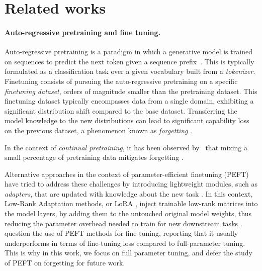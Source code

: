 \section{Related works}
\paragraph{Auto-regressive pretraining and fine tuning.} Auto-regressive pretraining is a paradigm in which a generative model is trained on sequences to predict the next token given a sequence prefix~\citep{sutskever2014sequence}. This is typically formulated as a classification task over a given vocabulary built from a \textit{tokenizer}. 
Finetuning consists of pursuing the auto-regressive pretraining on a specific \textit{finetuning dataset}, orders of magnitude smaller than the pretraining dataset. 
This finetuning dataset typically encompasses data from a single domain, exhibiting a significant distribution shift compared to the base dataset. 
Transferring the model knowledge to the new distributions can lead to significant capability loss on the previous dataset, a phenomenon known as \textit{forgetting} \cite{luo2023empirical,kalajdzievski2024scaling}.

In the context of \textit{continual pretraining}, it has been observed by~\citet{ibrahim2024simple} that mixing a small percentage of pretraining data mitigates forgetting \citep[see][for an analytical framework to explore how task similarity can affect knowledge transfer]{hiratani2024disentangling}.




Alternative approaches in the context of parameter-efficient finetuning (PEFT) have tried to address these challenges by introducing lightweight modules, such as \textit{adapters}, that are updated with knowledge about the new task \cite{houlsby2019parameter, he2022unified}. 
In this context, Low-Rank Adaptation methods, or LoRA \cite{hu2021lora, zhang2024when}, inject trainable low-rank matrices into the model layers, by adding them to the untouched original model weights, thus reducing the parameter overhead needed to train for new downstream tasks \citep[see][for a discussion on the different roles of LoRA decomposition matrices]{zhu2024asymmetry}.
\citet{zhang2024when} question the use of PEFT methods for fine-tuning, reporting that it usually underperforms in terms of fine-tuning loss compared to full-parameter tuning. 
This is why in this work, we focus on full parameter tuning, and defer the study of PEFT on forgetting for future work. 

